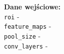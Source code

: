 \vspace{0.3cm}
\textbf{Dane wejściowe:} \\
\hspace*{\algorithmicindent} \verb|roi| - \roidescription \\
\hspace*{\algorithmicindent} \verb|feature_maps| - \featuremapdescription \\
\hspace*{\algorithmicindent} \verb|pool_size| - \poolsizedescription \\
\hspace*{\algorithmicindent} \verb|conv_layers| - \convlayersdescription \\
